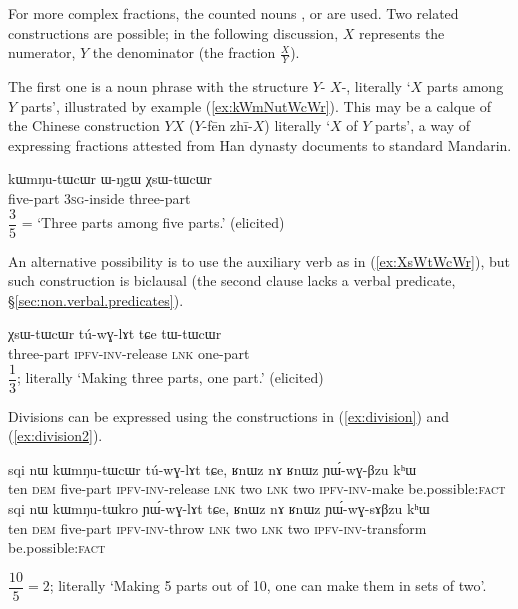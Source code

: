 For more complex fractions, the counted nouns ,  or  are used. Two related constructions are possible; in the following discussion, $X$ represents the numerator, $Y$ the denominator (the fraction $\frac{X}{Y}$). 

The first one is a noun phrase with the structure $Y$-  $X$-, literally `$X$ parts among $Y$ parts', illustrated by example (\ref{ex:kWmNutWcWr}). This may be a calque of the Chinese construction $Y$$X$ 
($Y$-fēn zhī-$X$) literally `$X$ of $Y$ parts', a way of expressing fractions attested from Han dynasty documents \citep{anicotte15fractions} to standard Mandarin.
 
\begin{exe}
\ex \label{ex:kWmNutWcWr}
\gll kɯmŋu-tɯcɯr ɯ-ŋgɯ χsɯ-tɯcɯr  \\
 five-part \textsc{3sg}-inside three-part \\
\glt $\dfrac{3}{5}$ = `Three parts among five parts.' (elicited)
\end{exe}

An alternative possibility is to use the auxiliary verb  as in (\ref{ex:XsWtWcWr}), but such construction is biclausal (the second clause lacks a verbal predicate, §\ref{sec:non.verbal.predicates}).

\begin{exe}
\ex \label{ex:XsWtWcWr}
\gll χsɯ-tɯcɯr tú-wɣ-lɤt tɕe tɯ-tɯcɯr   \\
 three-part \textsc{ipfv}-\textsc{inv}-release \textsc{lnk} one-part \\
\glt $\dfrac{1}{3}$; literally `Making three parts, one part.' (elicited)
\end{exe}

Divisions can be expressed using the constructions in  (\ref{ex:division}) and (\ref{ex:division2}).

\begin{exe}
\ex
\begin{xlist}
\ex \label{ex:division}
\gll sqi nɯ kɯmŋu-tɯcɯr tú-wɣ-lɤt tɕe, ʁnɯz nɤ ʁnɯz ɲɯ́-wɣ-βzu kʰɯ \\
 ten \textsc{dem} five-part \textsc{ipfv}-\textsc{inv}-release \textsc{lnk} two \textsc{lnk} two \textsc{ipfv}-\textsc{inv}-make be.possible:\textsc{fact} \\
 \ex \label{ex:division2}
\gll sqi nɯ kɯmŋu-tɯkro ɲɯ́-wɣ-lɤt tɕe, ʁnɯz nɤ ʁnɯz ɲɯ́-wɣ-sɤβzu kʰɯ \\
 ten \textsc{dem} five-part \textsc{ipfv}-\textsc{inv}-throw \textsc{lnk} two \textsc{lnk} two \textsc{ipfv}-\textsc{inv}-transform be.possible:\textsc{fact} \\
 \end{xlist}
\glt $\dfrac{10}{5}=2$; literally `Making 5 parts out of 10, one can make them in sets of two'.
\end{exe}

